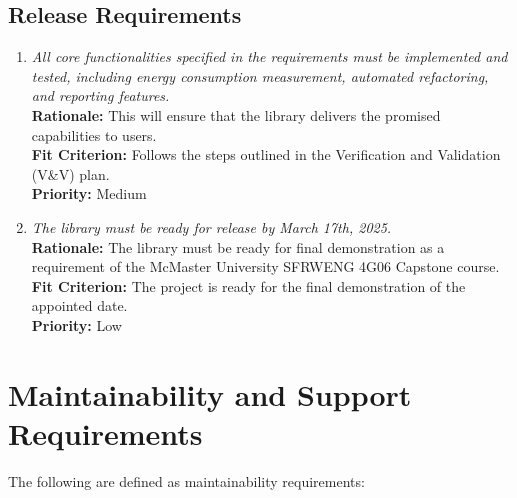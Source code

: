\documentclass[12pt]{article}
\begin{document}
\subsection{Release Requirements}
\begin{enumerate}[label=OER-RL \arabic*., wide=0pt, leftmargin=*]
  \item \emph{All core functionalities specified in the requirements
      must be implemented and tested, including energy consumption
    measurement, automated refactoring, and reporting features.}\\[2mm]
    {\bf Rationale:} This will ensure that the library delivers the
    promised capabilities to users.\\
    {\bf Fit Criterion:} Follows the steps outlined in the
    Verification and Validation (V\&V) plan.  \\
    {\bf Priority:} Medium
  \item \emph{The library must be ready for release by March 17th, 2025.}\\[2mm]
    {\bf Rationale:} The library must be ready for final
    demonstration as a requirement of the McMaster University SFRWENG
    4G06 Capstone course.\\
    {\bf Fit Criterion:} The project is ready for the final
    demonstration of the appointed date.\\
    {\bf Priority:} Low
\end{enumerate}

\section{Maintainability and Support Requirements}
The following are defined as maintainability requirements:
\end{document}
